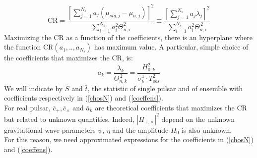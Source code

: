 \documentclass[11pt,a4paper,final]{iopart}
\begin{document}
\begin{equation}\label{CRt}
\textrm{CR}= \frac{\left[\sum_{j=1}^{N_s} a_j (\mu_{sig,j}-\mu_{n,j})\right]^2}{\sum_{i=1}^{N_s} a_i^2 \Theta^2_{n,i}} \equiv \frac{\left[\sum_{j=1}^{N_s} a_j \lambda_j\right]^2}{\sum_{i=1}^{N_s} a_i^2 \Theta_{n,i}^{\,2}}
\end{equation}
Maximizing the $\textrm{CR}$ as a function of the coefficients, there is an hyperplane where the function $\textrm{CR}(a_1,..,a_{N_s})$ has maximum value.
A particular, simple choice of the coefficients that maximizes the $\textrm{CR}$, is:
\begin{equation}\label{coeffens}
\bar{a}_k=\frac{\lambda_k}{\Theta_{n,k}^{\,2}}=\frac{H_{0,k}^2}{\sigma^4_{k}\cdot T_{obs}^2 }
\end{equation}
 We will indicate by $\bar{S}$ and $\bar{t}$, the statistic of single pulsar and of ensemble with coefficients respectively in (\ref{chosN}) and (\ref{coeffens}).
\\For real pulsar, $\bar{c}_+,\bar{c}_\times$ and $\bar{a}_k$ are theoretical coefficients that maximizes the CR but related to unknown quantities. Indeed, $|H_{+,\times}|^2$ depend on the unknown gravitational wave parameters $\psi$, $\eta$ and the amplitude $H_0$ is also unknown.
\\For this reason, we need approximated expressions for the coefficients in (\ref{chosN}) and (\ref{coeffens}). 
\end{document}
